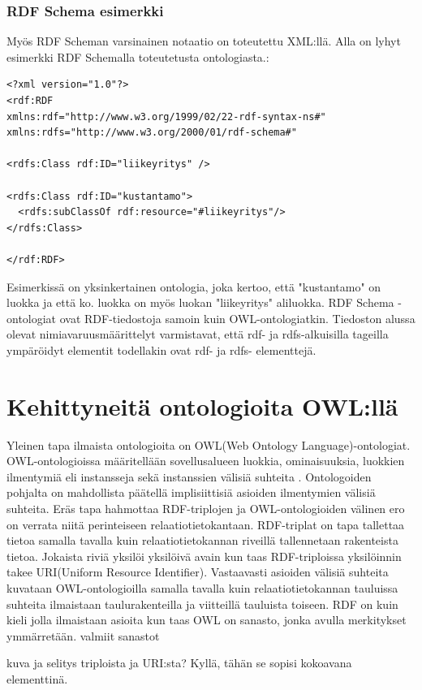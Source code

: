 \documentclass[finnish]{tktltiki2}
\theoremstyle{definition}
\theoremstyle{remark}
\begin{document}
\subsubsection{RDF Schema esimerkki}
Myös RDF Scheman varsinainen notaatio on toteutettu XML:llä. Alla on lyhyt esimerkki RDF Schemalla toteutetusta ontologiasta.: 
\begin{verbatim}
<?xml version="1.0"?>
<rdf:RDF
xmlns:rdf="http://www.w3.org/1999/02/22-rdf-syntax-ns#"
xmlns:rdfs="http://www.w3.org/2000/01/rdf-schema#"

<rdfs:Class rdf:ID="liikeyritys" />

<rdfs:Class rdf:ID="kustantamo">
  <rdfs:subClassOf rdf:resource="#liikeyritys"/>
</rdfs:Class>

</rdf:RDF>
\end{verbatim}

Esimerkissä on yksinkertainen ontologia, joka kertoo, että "kustantamo" on luokka ja että ko. luokka on myös luokan "liikeyritys" aliluokka. RDF Schema  -ontologiat ovat RDF-tiedostoja samoin kuin OWL-ontologiatkin. Tiedoston alussa olevat nimiavaruusmäärittelyt varmistavat, että rdf- ja rdfs-alkuisilla tageilla ympäröidyt elementit todellakin ovat rdf- ja rdfs- elementtejä.  
\section{Kehittyneitä ontologioita OWL:llä}

Yleinen tapa ilmaista ontologioita on OWL(Web Ontology Language)-ontologiat.
OWL-ontologioissa määritellään sovellusalueen luokkia, ominaisuuksia, luokkien
ilmentymiä eli instansseja  sekä instanssien välisiä suhteita \cite{SWM04}.
Ontologoiden pohjalta on mahdollista päätellä implisiittisiä asioiden
ilmentymien välisiä suhteita. Eräs tapa hahmottaa RDF-triplojen ja
OWL-ontologioiden välinen ero on verrata niitä perinteiseen
relaatiotietokantaan. RDF-triplat on tapa tallettaa tietoa samalla tavalla kuin
relaatiotietokannan riveillä tallennetaan rakenteista tietoa. Jokaista riviä
yksilöi yksilöivä avain kun taas RDF-triploissa yksilöinnin takee URI(Uniform
Resource Identifier). Vastaavasti asioiden välisiä suhteita kuvataan
OWL-ontologioilla samalla tavalla kuin relaatiotietokannan tauluissa suhteita
ilmaistaan taulurakenteilla ja viitteillä tauluista toiseen. 
RDF on kuin kieli jolla ilmaistaan asioita kun taas OWL on sanasto, jonka avulla
merkitykset ymmärretään. 
valmiit sanastot

kuva ja selitys triploista ja URI:sta? Kyllä, tähän se sopisi kokoavana
elementtinä.
\end{document}

